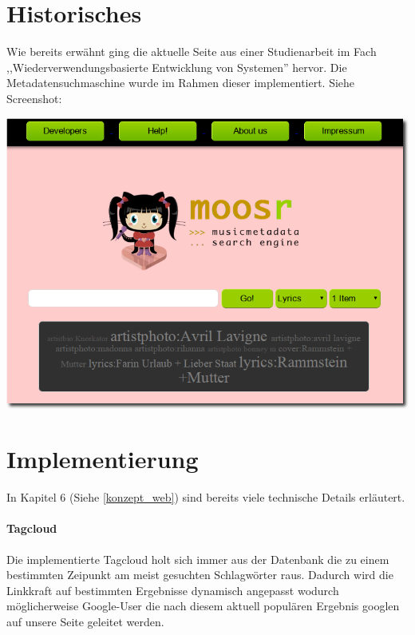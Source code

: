 \section{Historisches}

Wie bereits erwähnt ging die aktuelle Seite aus einer Studienarbeit im Fach 
,,Wiederverwendungsbasierte Entwicklung von Systemen'' hervor. Die
Metadatensuchmaschine wurde im Rahmen dieser implementiert. Siehe Screenshot:

\begin{center}
\includegraphics[scale=0.5]{../screenshots/old_site.png}
\end{center}


\section{Implementierung}

In Kapitel 6 (Siehe \ref{konzept_web}) sind bereits viele technische Details erläutert.

\paragraph{Tagcloud}
Die implementierte Tagcloud holt sich immer aus der Datenbank die zu einem
bestimmten Zeipunkt am meist gesuchten Schlagwörter raus. Dadurch wird die
Linkkraft auf bestimmten Ergebnisse dynamisch angepasst wodurch möglicherweise
Google-User die nach diesem aktuell populären Ergebnis googlen auf unsere Seite
geleitet werden.
